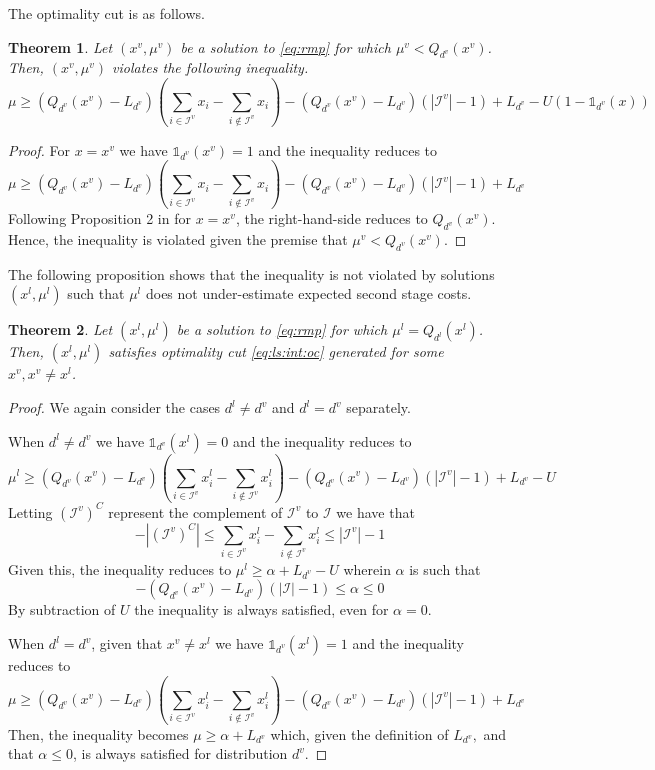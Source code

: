 \documentclass[12pt]{article}
\newtheorem{theorem}{Theorem}%
\theoremstyle{thmstylethree}%
\newcommand{\mtc}[1] {\mathcal{#1}}
\def\Ind{\ensuremath{\mathbb{1}}}
\begin{document}
The optimality cut is as follows. 
\begin{theorem}\label{prop:oc:int}
Let $(x^v,\mu^v)$ be a solution to \eqref{eq:rmp} for which $\mu^v<Q_{d^v}(x^v)$. 
Then, $(x^v,\mu^v)$ violates the following inequality.
    \begin{equation}\label{eq:ls:int:oc}
        \mu\geq (Q_{d^v}(x^v)-L_{d^v})\left(\sum_{i\in\mtc{I}^v}x_i-\sum_{i\notin\mtc{I}^v}x_i\right)-\left(Q_{d^v}(x^v)-L_{d^v}\right)\left(|\mtc{I}^v|-1\right)+L_{d^v}-U\left(1-\Ind_{d^v}(x)\right)
    \end{equation}
\end{theorem}
\begin{proof}
For $x=x^v$ we have $\Ind_{d^v}(x^v)=1$ and the inequality reduces to 
$$\mu\geq \left(Q_{d^v}(x^v)-L_{d^v}\right)\left(\sum_{i\in\mtc{I}^v}x_i-\sum_{i\notin\mtc{I}^v}x_i\right)-\left(Q_{d^v}(x^v)-L_{d^v}\right)\left(|\mtc{I}^v|-1\right)+L_{d^v}$$
Following Proposition 2 in \cite{LapL93} for $x=x^v$, the right-hand-side reduces to $Q_{d^v}(x^v)$. Hence, the inequality is violated given the premise that
 $\mu^v<Q_{d^v}(x^v)$.
\end{proof}
The following proposition shows that the inequality is not violated by solutions $(x^l,\mu^l)$ such that $\mu^l$ does not under-estimate expected second stage costs.
\begin{theorem}\label{prop:oc:int:safe}
Let $(x^l,\mu^l)$ be a solution to \eqref{eq:rmp} for which $\mu^l=Q_{d^l}(x^l)$. 
Then, $(x^l,\mu^l)$ satisfies optimality cut \eqref{eq:ls:int:oc} generated for some $x^v, x^v \neq x^l$.
\end{theorem}
\begin{proof}
We again consider the cases $d^l\neq d^v$ and $d^l=d^v$ separately.

When $d^l\neq d^v$ we have $\Ind_{d^v}(x^l)=0$ and the inequality reduces to
$$\mu^l\geq \left(Q_{d^v}(x^v)-L_{d^v}\right)\left(\sum_{i\in\mtc{I}^v}x^l_i-\sum_{i\notin\mtc{I}^v}x^l_i\right)-\left(Q_{d^v}(x^v)-L_{d^v}\right)\left(|\mtc{I}^v|-1\right)+L_{d^v}-U$$
Letting $(\mtc{I}^v)^C$ represent the complement of $\mtc{I}^v$ to $\mtc{I}$ we have that 
$$-|(\mtc{I}^v)^C|\leq \sum_{i\in\mtc{I}^v}x^l_i-\sum_{i\notin\mtc{I}^v}x^l_i\leq |\mtc{I}^v|-1$$
Given this, the inequality reduces to $\mu^l\geq \alpha+L_{d^v}-U$ wherein $\alpha$ is such that $$-(Q_{d^v}(x^v)-L_{d^v})(|\mtc{I}|-1)\leq \alpha\leq 0 $$
By subtraction of $U$ the inequality is always satisfied, even for $\alpha=0$.

When $d^l= d^v$, given that $x^v\neq x^l$ we have $\Ind_{d^v}(x^l)=1$ and the inequality reduces to
$$\mu\geq \left(Q_{d^v}(x^v)-L_{d^v}\right)\left(\sum_{i\in\mtc{I}^v}x^l_i-\sum_{i\notin\mtc{I}^v}x^l_i\right)-\left(Q_{d^v}(x^v)-L_{d^v}\right)\left(|\mtc{I}^v|-1\right)+L_{d^v}$$
Then, the inequality becomes $\mu\geq \alpha+L_{d^v}$ which, given the definition of $L_{d^v},$ and that $\alpha\leq 0$, is always satisfied for distribution $d^v$. 
\end{proof}
\end{document}
